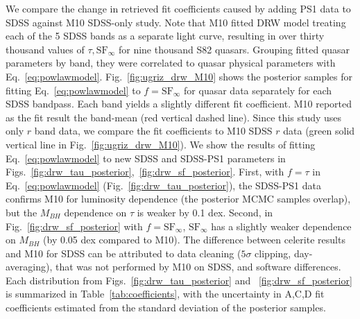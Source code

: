 \documentclass[twocolumn]{aastex62}
\let\oldAA\AA
\renewcommand{\AA}{\text{\normalfont\oldAA}}
\newcommand{\project}[1]{\textsf{#1}}
\begin{document}
We compare the change in retrieved fit coefficients caused by adding PS1 data to SDSS against M10 SDSS-only study. Note that M10 fitted  DRW model treating each of the 5 SDSS bands as a separate light curve, resulting in over thirty thousand values of $\tau, \mathrm{SF}_{\infty}$ for nine thousand S82 quasars. Grouping fitted quasar parameters by band, they were correlated to quasar physical parameters with Eq.~\ref{eq:powlawmodel}. Fig.~\ref{fig:ugriz_drw_M10} shows the posterior samples for fitting  Eq.~\ref{eq:powlawmodel} to $f=\mathrm{SF}_{\infty}$ for quasar data separately for each SDSS bandpass.  Each band yields a slightly different fit coefficient. M10 reported as the fit result the band-mean (red vertical dashed line). Since this study uses only $r$ band data, we compare the fit coefficients to M10 SDSS $r$ data (green solid vertical line in Fig.~\ref{fig:ugriz_drw_M10}). We show the results of fitting Eq.~\ref{eq:powlawmodel} to new SDSS and SDSS-PS1 parameters in Figs.~\ref{fig:drw_tau_posterior},~\ref{fig:drw_sf_posterior}. First, with $f=\tau$ in Eq.~\ref{eq:powlawmodel} (Fig.~\ref{fig:drw_tau_posterior}), the SDSS-PS1 data confirms M10 for luminosity dependence (the posterior MCMC samples overlap), but the $M_{BH}$ dependence on $\tau$ is weaker by 0.1 dex. Second, in Fig.~\ref{fig:drw_sf_posterior} with  $f=\mathrm{SF}_{\infty}$, $\mathrm{SF}_{\infty}$ has a slightly weaker dependence on $M_{BH}$ (by 0.05 dex compared to M10). The difference between \project{celerite} results and M10 for SDSS can be attributed to data cleaning ($5\sigma$ clipping, day-averaging), that was not performed by M10 on SDSS, and software differences. Each distribution from 
Figs.~\ref{fig:drw_tau_posterior} and ~\ref{fig:drw_sf_posterior} is summarized in Table~\ref{tab:coefficients}, with the uncertainty in A,C,D fit coefficients estimated from  the standard deviation of the posterior samples. 


\begin{figure*}  %
\caption{Posterior MCMC draws for fitting Eq.~\ref{eq:powlawmodel} with M10 variability amplitude $\mathrm{SF}_{\infty}$ against $M_{BH}$, $M_{i}$, $z$ \citep{shen2011}. Since M10 treated the near-simulaneous SDSS $ugriz$ data for 9258 quasars, independently for each band, this resulted in  DRW fit parameters for 7014 $u$,  7408 $g$,  6871 $r$, 6814 $i$, and 5111 $z$-band SDSS quasar light curves that fulfilled M10 quality of DRW fit selection criteria. M10 values for $\mathrm{SF}_{\infty}$ are corrected to 4000 $\mbox{\AA}$ using Eq.~\ref{eq:lambda}, with the power-law coefficient $B=-0.479$. Each distribution corresponds to a different SDSS band. We compare the results of fitting SDSS-PS1 $r$-band directly against M10 results for SDSS $r$-band (solid green). Note that Table 1 in M10 reported band-averaged values for A,C,D coeffieicnts (vertical dashed red line), while we cite in Table~\ref{tab:coefficients} the maen for $r$-band (vertical solid green line).}
\label{fig:ugriz_drw_M10}
\end{figure*} 
\end{document}
